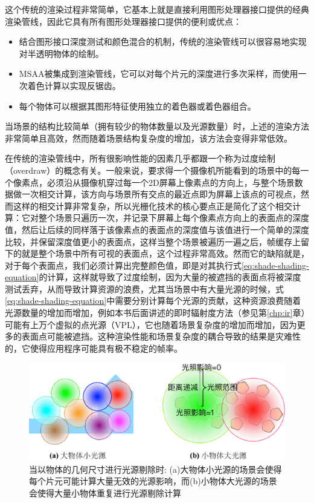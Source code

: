 这个传统的渲染过程非常简单，它基本上就是直接利用图形处理器接口提供的经典渲染管线，因此它具有所有图形处理器接口提供的便利或优点：

\begin{itemize}
	\item 结合图形接口深度测试和颜色混合的机制，传统的渲染管线可以很容易地实现对半透明物体的绘制。
	\item MSAA被集成到渲染管线，它可以对每个片元的深度进行多次采样，而使用一次着色计算以实现反锯齿。
	\item 每个物体可以根据其图形特征使用独立的着色器或着色器组合。
\end{itemize}

当场景的结构比较简单（拥有较少的物体数量以及光源数量）时，上述的渲染方法非常简单且高效，然而随着场景结构复杂度的增加，该方法会变得非常低效。

在传统的渲染管线中，所有很影响性能的因素几乎都跟一个称为过度绘制（overdraw）的概念有关。一般来说，要求得一个摄像机所能看到的场景中的每一个像素点，必须沿从摄像机穿过每一个2D屏幕上像素点的方向上，与整个场景数据做一次相交计算，该方向与场景所有交点的最近点即为屏幕上该点的可视点，然而这样的相交计算非常复杂，所以光栅化技术的核心要点正是简化了这个相交计算：它对整个场景只遍历一次，并记录下屏幕上每个像素点方向上的表面点的深度值，然后让后续的同样落于该像素点的表面点的深度值与该值进行一个简单的深度比较，并保留深度值更小的表面点，这样当整个场景被遍历一遍之后，帧缓存上留下的就是整个场景中所有可视的表面点，这个过程非常高效。然而它的缺陷就是，对于每个表面点，我们必须计算出完整颜色值，即是对其执行式\ref{eq:shade-shading-equation}的计算，这样就导致了过度绘制，因为大量的被遮挡的表面点将被深度测试丢弃，从而导致计算资源的浪费，尤其当场景中有大量光源的时候，式\ref{eq:shade-shading-equation}中需要分别计算每个光源的贡献，这种资源浪费随着光源数量的增加而增加，例如本书后面讲述的即时辐射度方法（参见第\ref{chp:ir}章）可能有上万个虚拟的点光源（VPL），它也随着场景复杂度的增加而增加，因为更多的表面点可能被遮挡。这种渲染性能和场景复杂度的耦合导致的结果是灾难性的，它使得应用程序可能具有极不稳定的帧率。

\begin{figure}
\begin{center}
	\includegraphics[width=.8\textwidth]{figures/shade/light-culling}
\end{center}
	\caption{当以物体的几何尺寸进行光源剔除时: (a)大物体小光源的场景会使得每个片元可能计算大量无效的光源影响，而(b)小物体大光源的场景会使得大量小物体重复进行光源剔除计算}
	\label{f:shade-light-culling}
\end{figure}

